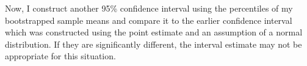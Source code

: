 \documentclass[
]{article}
\newenvironment{Shaded}{\begin{snugshade}}{\end{snugshade}}
\newcommand{\AttributeTok}[1]{\textcolor[rgb]{0.13,0.29,0.53}{#1}}
\newcommand{\CommentTok}[1]{\textcolor[rgb]{0.56,0.35,0.01}{\textit{#1}}}
\newcommand{\ConstantTok}[1]{\textcolor[rgb]{0.56,0.35,0.01}{#1}}
\newcommand{\ControlFlowTok}[1]{\textcolor[rgb]{0.13,0.29,0.53}{\textbf{#1}}}
\newcommand{\DecValTok}[1]{\textcolor[rgb]{0.00,0.00,0.81}{#1}}
\newcommand{\FunctionTok}[1]{\textcolor[rgb]{0.13,0.29,0.53}{\textbf{#1}}}
\newcommand{\NormalTok}[1]{#1}
\newcommand{\OtherTok}[1]{\textcolor[rgb]{0.56,0.35,0.01}{#1}}
\newcommand{\SpecialCharTok}[1]{\textcolor[rgb]{0.81,0.36,0.00}{\textbf{#1}}}
\begin{document}
\begin{Shaded}
\end{Shaded}

Now, I construct another 95\% confidence interval using the percentiles
of my bootstrapped sample means and compare it to the earlier confidence
interval which was constructed using the point estimate and an
assumption of a normal distribution. If they are significantly
different, the interval estimate may not be appropriate for this
situation.
\end{document}
